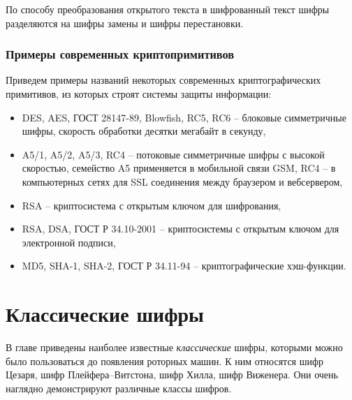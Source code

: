 \documentclass[10pt,a4paper]{book}
\begin{document}
По способу преобразования открытого текста в шифрованный текст шифры разделяются на шифры замены и шифры перестановки.







\subsection{Примеры современных криптопримитивов}

Приведем примеры названий некоторых современных криптографических примитивов, из которых строят системы защиты информации:
\begin{itemize}
    \item DES, AES, ГОСТ 28147-89, Blowfish, RC5, RC6 -- блоковые симметричные шифры, скорость обработки десятки мегабайт в секунду,
    \item A5/1, A5/2, A5/3, RC4 -- потоковые симметричные шифры с высокой скоростью, семейство A5 применяется в мобильной связи GSM, RC4 -- в компьютерных сетях для SSL соединения между браузером и вебсервером,
    \item RSA -- криптосистема с открытым ключом для шифрования,
    \item RSA, DSA, ГОСТ Р 34.10-2001 -- криптосистемы с открытым ключом для электронной подписи,
    \item MD5, SHA-1, SHA-2, ГОСТ Р 34.11-94 -- криптографические хэш-функции.
\end{itemize}





\chapter{Классические шифры}

В главе приведены наиболее известные \emph{классические} шифры,  которыми можно было пользоваться до появления роторных машин. К ним относятся шифр Цезаря, шифр Плейфера--Витстона, шифр Хилла, шифр Виженера. Они очень наглядно демонстрируют различные классы шифров.






\end{document}
